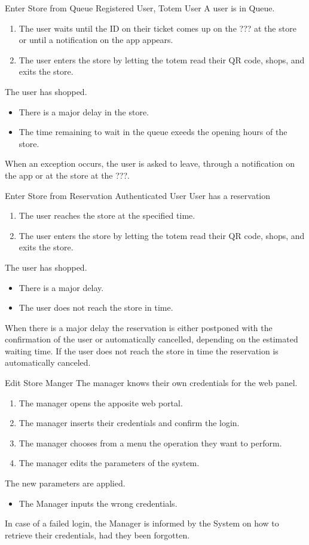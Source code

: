 \usecase
{Enter Store from Queue}
{Registered User, Totem User}
{A user is in Queue.}
{
    \begin{enumerate}
        \item The user waits until the ID on their ticket comes up on the ??? at the store or until a notification on the app appears.
        \item The user enters the store by letting the totem read their QR code, shops, and exits the store.
    \end{enumerate}
}
{
    The user has shopped.
}
{
    \begin{itemize}
        \item There is a major delay in the store. 
        \item The time remaining to wait in the queue exeeds the opening hours of the store. 
    \end{itemize}
}
{
    When an exception occurs, the user is asked to leave, through a notification on the app or at the store at the ???. 
}

\usecase
{Enter Store from Reservation}
{Authenticated User}
{User has a reservation}
{
        \begin{enumerate}
            \item The user reaches the store at the specified time.
            \item The user enters the store by letting the totem read their QR code, shops, and exits the store.
        \end{enumerate}
}
{
    The user has shopped.
}
{
    \begin{itemize}
        \item There is a major delay.
        \item The user does not reach the store in time.
    \end{itemize}
}
{
    When there is a major delay the reservation is either postponed with the confirmation of the user or automatically cancelled, depending on the estimated waiting time.
    If the user does not reach the store in time the reservation is automatically canceled.
}

\usecase
{Edit Store}
{Manger}
{The manager knows their own credentials for the web panel.}
{
    \begin{enumerate}
        \item The manager opens the apposite web portal.
        \item The manager inserts their credentials and confirm the login.
        \item The manager chooses from a menu the operation they want to perform.
        \item The manager edits the parameters of the system.
    \end{enumerate}
}
{
    The new parameters are applied.
}
{
    \begin{itemize}
        \item The Manager inputs the wrong credentials.
    \end{itemize}
}
{
    In case of a failed login, the Manager is informed by the System on how to retrieve their credentials, had they been forgotten.
}

